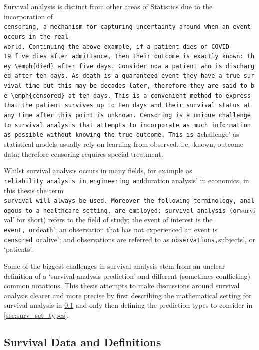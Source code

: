 \documentclass[
  letterpaper,
]{scrbook}
\theoremstyle{plain}
\theoremstyle{definition}
\theoremstyle{remark}
\begin{document}
Survival analysis is distinct from other areas of Statistics due to the
incorporation of
\texttt{censoring\textquotesingle{},\ a\ mechanism\ for\ capturing\ uncertainty\ around\ when\ an\ event\ occurs\ in\ the\ real-world.\ Continuing\ the\ above\ example,\ if\ a\ patient\ dies\ of\ COVID-19\ five\ dies\ after\ admittance,\ then\ their\ outcome\ is\ exactly\ known:\ they\ \textbackslash{}emph\{died\}\ after\ five\ days.\ Consider\ now\ a\ patient\ who\ is\ discharged\ after\ ten\ days.\ As\ death\ is\ a\ guaranteed\ event\ they\ have\ a\ true\ survival\ time\ but\ this\ may\ be\ decades\ later,\ therefore\ they\ are\ said\ to\ be\ \textbackslash{}emph\{censored\}\ at\ ten\ days.\ This\ is\ a\ convenient\ method\ to\ express\ that\ the\ patient\ survives\ up\ to\ ten\ days\ and\ their\ survival\ status\ at\ any\ time\ after\ this\ point\ is\ unknown.\ Censoring\ is\ a\ unique\ challenge\ to\ survival\ analysis\ that\ attempts\ to\ incorporate\ as\ much\ information\ as\ possible\ without\ knowing\ the\ true\ outcome.\ This\ is\ a}challenge'
as statistical models usually rely on learning from observed,
i.e.~known, outcome data; therefore censoring requires special
treatment.

Whilst survival analysis occurs in many fields, for example as
\texttt{reliability\ analysis\textquotesingle{}\ in\ engineering\ and}duration
analysis' in economics, in this thesis the term
\texttt{survival\textquotesingle{}\ will\ always\ be\ used.\ Moreover\ the\ following\ terminology,\ analogous\ to\ a\ healthcare\ setting,\ are\ employed:\ survival\ analysis\ (or}survival'
for short) refers to the field of study; the event of interest is the
\texttt{event\textquotesingle{},\ or}death'; an observation that has not
experienced an event is \texttt{censored\textquotesingle{}\ or}alive';
and observations are referred to as
\texttt{observations\textquotesingle{},}subjects', or `patients'.

Some of the biggest challenges in survival analysis stem from an unclear
definition of a `survival analysis prediction' and different (sometimes
conflicting) common notations. This thesis attempts to make discussions
around survival analysis clearer and more precise by first describing
the mathematical setting for survival analysis in
\ref{sec:surv_set_math} and only then defining the prediction types to
consider in \ref{sec:surv_set_types}.

\subsection{Survival Data and Definitions}
\label{sec:surv_set_math}
\end{document}
